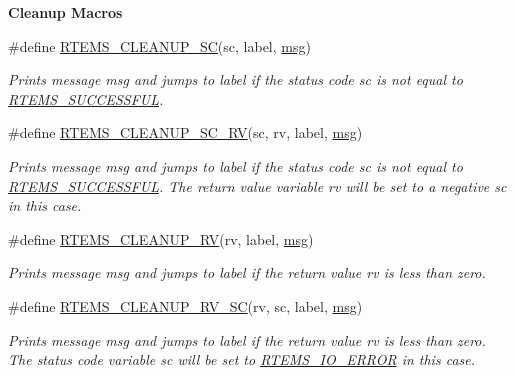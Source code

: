 \begin{Indent}\textbf{ Cleanup Macros}\par
\begin{DoxyCompactItemize}
\item 
\#define \mbox{\hyperlink{group__rtems__status__checks_ga7a4513d93b0e6baa53e29df854fb5507}{R\+T\+E\+M\+S\+\_\+\+C\+L\+E\+A\+N\+U\+P\+\_\+\+SC}}(sc,  label,  \mbox{\hyperlink{structmsg}{msg}})
\begin{DoxyCompactList}\small\item\em Prints message {\itshape msg} and jumps to {\itshape label} if the status code {\itshape sc} is not equal to \mbox{\hyperlink{group__ClassicStatus_gga545d41846817eaba6143d52ee4d9e9fea8a23e2d94778f09399da984d73562536}{R\+T\+E\+M\+S\+\_\+\+S\+U\+C\+C\+E\+S\+S\+F\+UL}}. \end{DoxyCompactList}\item 
\#define \mbox{\hyperlink{group__rtems__status__checks_ga76cb829de68a2f8221477cacc2d51b64}{R\+T\+E\+M\+S\+\_\+\+C\+L\+E\+A\+N\+U\+P\+\_\+\+S\+C\+\_\+\+RV}}(sc,  rv,  label,  \mbox{\hyperlink{structmsg}{msg}})
\begin{DoxyCompactList}\small\item\em Prints message {\itshape msg} and jumps to {\itshape label} if the status code {\itshape sc} is not equal to \mbox{\hyperlink{group__ClassicStatus_gga545d41846817eaba6143d52ee4d9e9fea8a23e2d94778f09399da984d73562536}{R\+T\+E\+M\+S\+\_\+\+S\+U\+C\+C\+E\+S\+S\+F\+UL}}. The return value variable {\itshape rv} will be set to a negative {\itshape sc} in this case. \end{DoxyCompactList}\item 
\#define \mbox{\hyperlink{group__rtems__status__checks_ga43b2b43b9c3728a8fb6128df2290ef8d}{R\+T\+E\+M\+S\+\_\+\+C\+L\+E\+A\+N\+U\+P\+\_\+\+RV}}(rv,  label,  \mbox{\hyperlink{structmsg}{msg}})
\begin{DoxyCompactList}\small\item\em Prints message {\itshape msg} and jumps to {\itshape label} if the return value {\itshape rv} is less than zero. \end{DoxyCompactList}\item 
\#define \mbox{\hyperlink{group__rtems__status__checks_ga6a8a7e598de3670c4804a2e191108531}{R\+T\+E\+M\+S\+\_\+\+C\+L\+E\+A\+N\+U\+P\+\_\+\+R\+V\+\_\+\+SC}}(rv,  sc,  label,  \mbox{\hyperlink{structmsg}{msg}})
\begin{DoxyCompactList}\small\item\em Prints message {\itshape msg} and jumps to {\itshape label} if the return value {\itshape rv} is less than zero. The status code variable {\itshape sc} will be set to \mbox{\hyperlink{group__ClassicStatus_gga545d41846817eaba6143d52ee4d9e9feaafb7268b75dfdd3f4518045e52525d45}{R\+T\+E\+M\+S\+\_\+\+I\+O\+\_\+\+E\+R\+R\+OR}} in this case. \end{DoxyCompactList}\item 

\end{DoxyCompactItemize}
\end{Indent}
